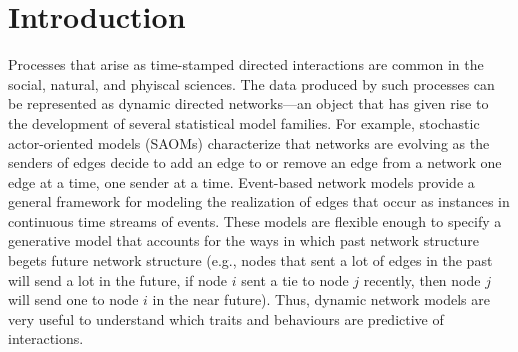\documentclass[ba]{imsart}
\numberwithin{equation}{section}
\theoremstyle{plain}
\begin{document}
\begin{frontmatter}
		\begin{keyword}[class=MSC]
		\end{keyword}
		
		\begin{keyword}
		\end{keyword}
		
	\end{frontmatter}
	
	\section{Introduction}\label{sec:introduction}
	
	Processes that arise as time-stamped directed interactions are common in the social, natural, and phyiscal sciences. The data produced by such processes can be represented as dynamic directed networks---an object that has given rise to the development of several statistical model families. For example, stochastic actor-oriented models (SAOMs) \citep{snijders1996stochastic,snijders2007modeling} characterize that networks are evolving as the senders of edges decide to add an edge to or remove an edge from a network one edge at a time, one sender at a time. Event-based network models \citep{Butts2008,Vu2011,hunter2011dynamic,PerryWolfe2012} provide a general framework for modeling the realization of edges that occur as instances in continuous time streams of events. These models are flexible enough to specify a generative model that accounts for the ways in which past network structure begets future network structure (e.g., nodes that sent a lot of edges in the past will send a lot in the future, if node $i$ sent a tie to node $j$ recently, then node $j$ will send one to node $i$ in the near future). Thus, dynamic network models are very useful to understand which traits and behaviours are predictive of interactions. 
	
\end{document}
